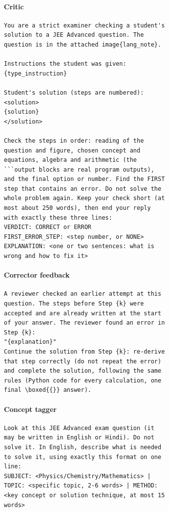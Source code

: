 \paragraph{Critic}
\begin{small}\begin{verbatim}
You are a strict examiner checking a student's
solution to a JEE Advanced question. The
question is in the attached image{lang_note}.

Instructions the student was given:
{type_instruction}

Student's solution (steps are numbered):
<solution>
{solution}
</solution>

Check the steps in order: reading of the
question and figure, chosen concept and
equations, algebra and arithmetic (the
```output blocks are real program outputs),
and the final option or number. Find the FIRST
step that contains an error. Do not solve the
whole problem again. Keep your check short (at
most about 250 words), then end your reply
with exactly these three lines:
VERDICT: CORRECT or ERROR
FIRST_ERROR_STEP: <step number, or NONE>
EXPLANATION: <one or two sentences: what is
wrong and how to fix it>
\end{verbatim}\end{small}

\paragraph{Corrector feedback}
\begin{small}\begin{verbatim}
A reviewer checked an earlier attempt at this
question. The steps before Step {k} were
accepted and are already written at the start
of your answer. The reviewer found an error in
Step {k}:
"{explanation}"
Continue the solution from Step {k}: re-derive
that step correctly (do not repeat the error)
and complete the solution, following the same
rules (Python code for every calculation, one
final \boxed{{}} answer).
\end{verbatim}\end{small}

\paragraph{Concept tagger}
\begin{small}\begin{verbatim}
Look at this JEE Advanced exam question (it
may be written in English or Hindi). Do not
solve it. In English, describe what is needed
to solve it, using exactly this format on one
line:
SUBJECT: <Physics/Chemistry/Mathematics> |
TOPIC: <specific topic, 2-6 words> | METHOD:
<key concept or solution technique, at most 15
words>
\end{verbatim}\end{small}

